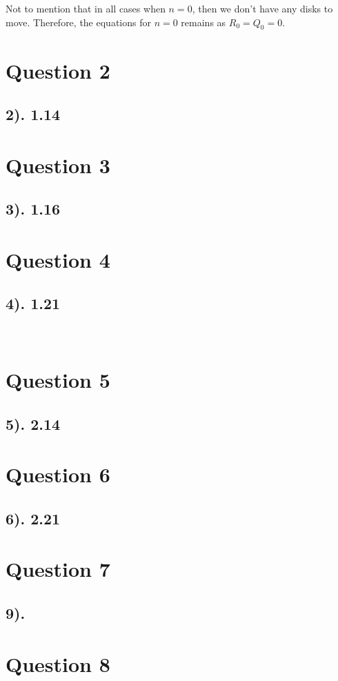 \documentclass[12pt]{article}
\begin{document}
Not to mention that in all cases when $n=0$, then we don't have any disks to move. Therefore, the equations for $n=0$ remains as $R_{0}=Q_{0}=0$.

\section*{Question 2}
\subsection*{2). 1.14}

\section*{Question 3}
\subsection*{3). 1.16}

\section*{Question 4}
\subsection*{4). 1.21}
\
\section*{Question 5}
\subsection*{5). 2.14}

\section*{Question 6}
\subsection*{6). 2.21}

\section*{Question 7}
\subsection*{9).}

\section*{Question 8}
\end{document}
